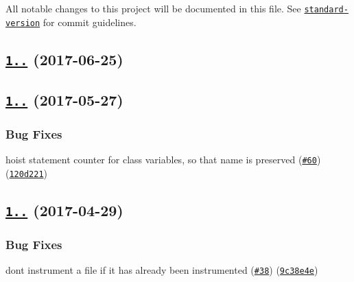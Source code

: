 All notable changes to this project will be documented in this file. See \href{https://github.com/conventional-changelog/standard-version}{\tt standard-\/version} for commit guidelines.

\label{_1.7.3}%
 \subsection*{\href{https://github.com/istanbuljs/istanbuljs/compare/istanbul-lib-instrument@1.7.2...istanbul-lib-instrument@1.7.3}{\tt 1..} (2017-\/06-\/25)}

\label{_1.7.2}%
 \subsection*{\href{https://github.com/istanbuljs/istanbuljs/compare/istanbul-lib-instrument@1.7.1...istanbul-lib-instrument@1.7.2}{\tt 1..} (2017-\/05-\/27)}

\subsubsection*{Bug Fixes}


\begin{DoxyItemize}
\item hoist statement counter for class variables, so that name is preserved (\href{https://github.com/istanbuljs/istanbuljs/issues/60}{\tt \#60}) (\href{https://github.com/istanbuljs/istanbuljs/commit/120d221}{\tt 120d221})
\end{DoxyItemize}

\label{_1.7.1}%
 \subsection*{\href{https://github.com/istanbuljs/istanbul-lib-instrument/compare/istanbul-lib-instrument@1.7.0...istanbul-lib-instrument@1.7.1}{\tt 1..} (2017-\/04-\/29)}

\subsubsection*{Bug Fixes}


\begin{DoxyItemize}
\item don\textquotesingle{}t instrument a file if it has already been instrumented (\href{https://github.com/istanbuljs/istanbuljs/issues/38}{\tt \#38}) (\href{https://github.com/istanbuljs/istanbul-lib-instrument/commit/9c38e4e}{\tt 9c38e4e})
\end{DoxyItemize}

